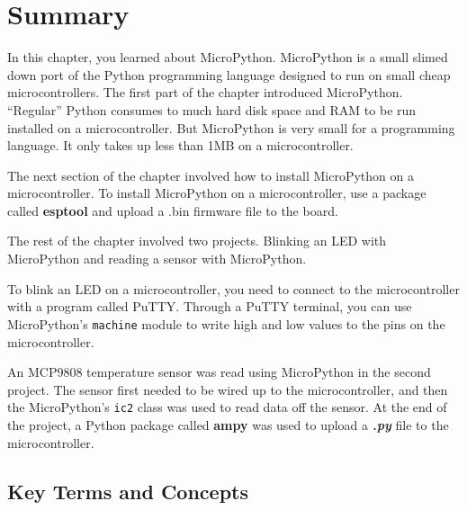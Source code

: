 \documentclass{book}
\begin{document}
    
        \newpage
        \section{Summary}\label{summary}

    




    
        In this chapter, you learned about MicroPython. MicroPython is a small
slimed down port of the Python programming language designed to run on
small cheap microcontrollers. The first part of the chapter introduced
MicroPython. ``Regular'' Python consumes to much hard disk space and RAM
to be run installed on a microcontroller. But MicroPython is very small
for a programming language. It only takes up less than 1MB on a
microcontroller.

The next section of the chapter involved how to install MicroPython on a
microcontroller. To install MicroPython on a microcontroller, use a
package called \textbf{esptool} and upload a .bin firmware file to the
board.

The rest of the chapter involved two projects. Blinking an LED with
MicroPython and reading a sensor with MicroPython.

To blink an LED on a microcontroller, you need to connect to the
microcontroller with a program called PuTTY. Through a PuTTY terminal,
you can use MicroPython's \lstinline!machine! module to write high and
low values to the pins on the microcontroller.

An MCP9808 temperature sensor was read using MicroPython in the second
project. The sensor first needed to be wired up to the microcontroller,
and then the MicroPython's \lstinline!ic2! class was used to read data
off the sensor. At the end of the project, a Python package called
\textbf{ampy} was used to upload a \textbf{\emph{.py}} file to the
microcontroller.
    




    
        \subsection{Key Terms and Concepts}\label{key-terms-and-concepts}
    
\end{document}
